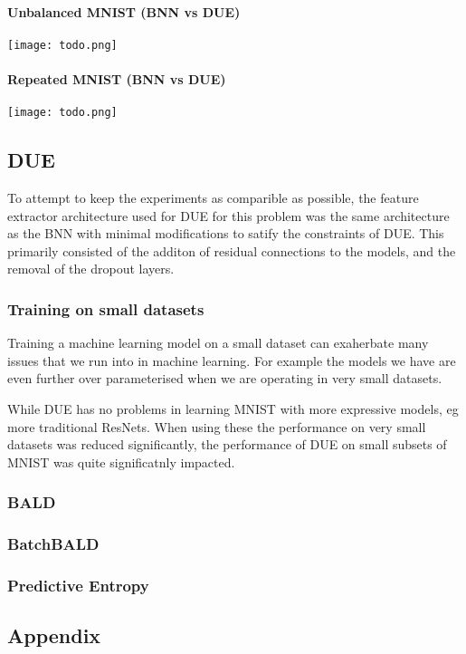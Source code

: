 \documentclass[12pt, a4paper]{report}
\theoremstyle{definition}
\begin{document}
\subsubsection{Unbalanced MNIST (BNN vs DUE)}

\texttt{[image: todo.png]}

\subsubsection{Repeated MNIST (BNN vs DUE)}

\texttt{[image: todo.png]}

\section{DUE}

To attempt to keep the experiments as comparible as possible, the feature extractor architecture used for DUE for this problem was the same architecture as the BNN with minimal modifications to satify the constraints of DUE. This primarily consisted of the additon of residual connections to the models, and the removal of the dropout layers.


\subsection{Training on small datasets}

Training a machine learning model on a small dataset can exaherbate many issues that we run into in machine learning. For example the models we have are even further over parameterised when we are operating in very small datasets.

While DUE has no problems in learning MNIST with more expressive models, eg more traditional ResNets. When using these the performance on very small datasets was reduced significantly, the performance of DUE on small subsets of MNIST was quite significatnly impacted.


\subsection{BALD}

\subsection{BatchBALD}

\subsection{Predictive Entropy}






\renewcommand{\bibname}{Bibliography}



\begin{appendices}
\chapter{Appendix}

\end{appendices}
\end{document}
